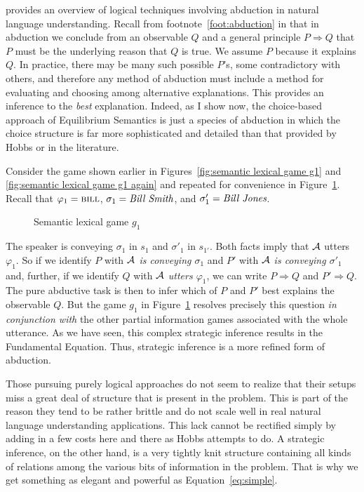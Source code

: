 \citet{hobbs:anlu} provides an overview of logical techniques involving abduction in natural language understanding. Recall from footnote~\ref{foot:abduction} in  that in abduction we conclude from an observable $Q$ and a general principle $P \Rightarrow Q$ that $P$ must be the underlying reason that $Q$ is true. We assume $P$ because it explains $Q$. In practice, there may be many such possible $P$'s, some contradictory with others, and therefore any method of abduction must include a method for evaluating and choosing among alternative explanations. This provides an inference to the \emph{best} explanation. Indeed, as I show now, the choice-based approach of Equilibrium Semantics is just a species of abduction in which the choice structure is far more sophisticated and detailed than that provided by Hobbs or in the literature.

Consider the game shown earlier in Figures~\ref{fig:semantic lexical game g1} and \ref{fig:semantic lexical game g1 again} and repeated for convenience in Figure~\ref{fig:semantic lexical game g1 again again}. Recall that $\varphi_1 = \Expression{Bill}$, $\sigma_1 = \emph{Bill Smith}$, and $\sigma'_1 = \emph{Bill Jones}$.

\begin{figure}[htbp] 

\caption{Semantic lexical game $g_1$}
\label{fig:semantic lexical game g1 again again}
\end{figure}

The speaker is conveying $\sigma_1$ in $s_1$ and $\sigma'_1$ in $s_{1'}$. Both facts imply that $\cal A$ utters $\varphi_1$. So if we identify $P$ with \emph{$\cal A$ is conveying $\sigma_1$} and $P'$ with \emph{$\cal A$ is conveying $\sigma'_1$} and, further, if we identify $Q$ with \emph{$\cal A$ utters $\varphi_1$}, we can write $P \Rightarrow Q$ and $P' \Rightarrow Q$. The pure abductive task is then to infer which of $P$ and $P'$ best explains the observable $Q$. But the game $g_1$ in Figure~\ref{fig:semantic lexical game g1 again again} resolves precisely this question \emph{in conjunction with} the other partial information games associated with the whole utterance. As we have seen, this complex strategic inference results in the Fundamental Equation. Thus, strategic inference is a more refined form of abduction.

Those pursuing purely logical approaches do not seem to realize that their set\-ups miss a great deal of structure that is present in the problem. This is part of the reason they tend to be rather brittle and do not scale well in real natural language understanding applications. This lack cannot be rectified simply by adding in a few costs here and there as Hobbs attempts to do. A strategic inference, on the other hand, is a very tightly knit structure containing all kinds of relations among the various bits of information in the problem. That is why we get something as elegant and powerful as Equation~\ref{eq:simple}.

